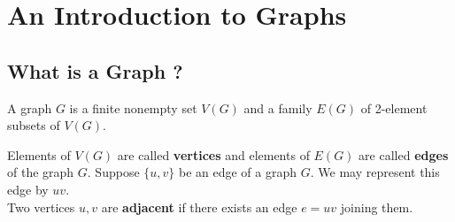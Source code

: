 

\section{An Introduction to Graphs}
\subsection{What is a Graph ?}
\begin{definition}[graph]
	A graph $G$ is a finite nonempty set $V(G)$ and a family $E(G)$ of 2-element subsets of $V(G)$.
\end{definition}

\begin{remark}
	Elements of $V(G)$ are called \textbf{vertices} and elements of $E(G)$ are called \textbf{edges} of the graph $G$.
	Suppose $\{u,v\}$ be an edge of a graph $G$. We may represent this edge by $uv$.\\

	Two vertices $u,v$ are \textbf{adjacent} if there exists an edge $e = uv$ joining them.
\end{remark}

